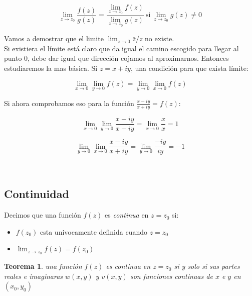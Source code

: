 \documentclass[12pt,a4paper]{book}
\newtheorem{theorem}{Teorema}[section]
\begin{document}
\begin{equation}
\lim_{z \rightarrow z_0}  \dfrac{f(z)}{g(z)} = \dfrac{\lim_{z \rightarrow z_0}  f(z)}{\lim_{z \rightarrow z_0} g(z)} \ \mathrm{si} \ \lim_{z \rightarrow z_0} g(z) \neq 0
\end{equation}




\hrulefill

Vamos a demostrar que el limite  $\lim_{z \rightarrow 0} \bar{z}/z$ no existe. \\

Si existiera el límite está claro que da igual el camino escogido para llegar al punto 0, debe dar igual que dirección cojamos al aproximarnos. Entonces estudiaremos la mas básica. Si $z=x+iy$, una condición para que exista límite: 

\begin{equation}
\lim_{x \rightarrow 0} \lim_{y \rightarrow 0} f(z) = \lim_{y \rightarrow 0} \lim_{x \rightarrow 0} f(z)
\end{equation}

Si ahora comprobamos eso para la función $\frac{x-iy}{x+iy}=f(z)$:

$$ \lim_{x \rightarrow 0} \lim_{y \rightarrow 0} \frac{x-iy}{x+iy} = \lim_{x \rightarrow 0} \dfrac{x}{x} = 1 $$

$$ \lim_{y \rightarrow 0} \lim_{x \rightarrow 0} \frac{x-iy}{x+iy} =  \lim_{y \rightarrow 0} \frac{-iy}{iy} = -1 $$

\hrulefill \\


\subsection*{Continuidad}

Decimos que una función $f(z)$ es \textit{continua} en $z=z_0$ si:

\begin{itemize}
\item $f(z_0)$ esta univocamente definida cuando $z=z_0$

\item $\lim_{z \rightarrow z_0} f(z) = f(z_0)$
\end{itemize} 

\begin{theorem}
 una función $f(z)$ es continua en $z=z_0$ si y solo si sus partes reales e imaginaras $w(x,y)$ y $v(x,y)$ son funciones continuas de $x$ e $y$ en $(x_0,y_0)$
\end{theorem}
\end{document}

